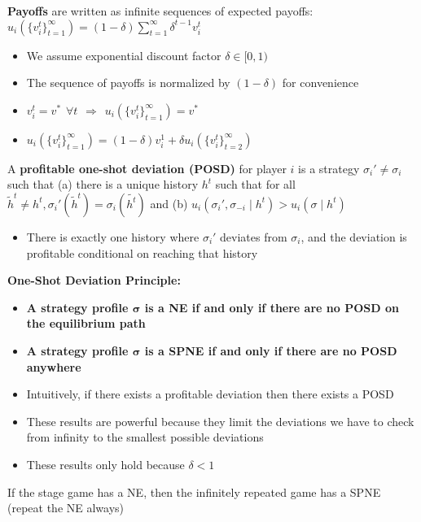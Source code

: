 \documentclass{report}
\begin{document}
\textbf{Payoffs} are written as infinite sequences of expected payoffs: \hspace{10pt} $u_i(\{v_i^t \}_{t=1}^\infty) = (1-\delta) \displaystyle\sum_{t =1}^\infty \delta^{t-1} v_i^t $
\begin{itemize}
	\item We assume exponential discount factor $\delta \in [0,1)$ 
	\item The sequence of payoffs is normalized by $(1 - \delta)$ for convenience
	\item $v_i^t = v^* \hspace{5pt} \forall t \hspace{5pt} \Rightarrow \hspace{5pt} u_i(\{v_i^t \}_{t=1}^\infty) = v^*$
	\item $u_i(\{v_i^t \}_{t=1}^\infty) = (1-\delta) v_i^1 + \delta u_i (\{v_i^t \}_{t=2}^\infty)$
\end{itemize} \bigskip

A \textbf{profitable one-shot deviation (POSD)} for player $i$ is a strategy $\sigma_i' \neq \sigma_i$ such that (a) there is a unique history $h^t$ such that for all $\widetilde{h}^t \neq h^t, \sigma_i'(\widetilde{h}^t) = \sigma_i(\widetilde{h^t})$ and (b) $u_i(\sigma_i',\sigma_{-i} \mid h^t ) > u_i(\sigma \mid h^t)$
\begin{itemize}
	\item There is exactly one history where $\sigma_i'$ deviates from $\sigma_i$, and the deviation is profitable conditional on reaching that history
\end{itemize} \bigskip

\textbf{One-Shot Deviation Principle:}
\begin{itemize}
	\item \textbf{A strategy profile $\boldsymbol{\sigma}$ is a NE if and only if there are no POSD on the equilibrium path}
	\item \textbf{A strategy profile $\boldsymbol{\sigma}$ is a SPNE if and only if there are no POSD anywhere}
	\item Intuitively, if there exists a profitable deviation then there exists a POSD
	\item These results are powerful because they limit the deviations we have to check from infinity to the smallest possible deviations
	\item These results only hold because $\delta < 1$
\end{itemize}

\bigskip 
If the stage game has a NE, then the infinitely repeated game has a SPNE (repeat the NE always) \newpage
\end{document}
